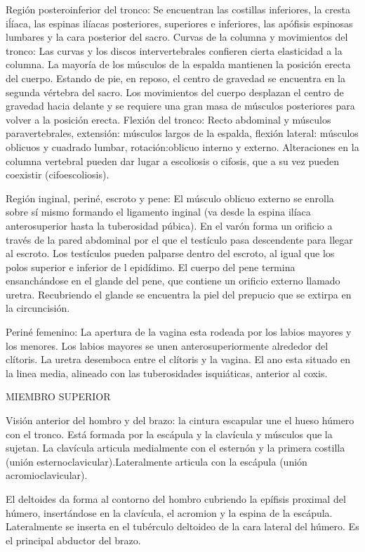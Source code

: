 Región posteroinferior del tronco: Se encuentran las costillas inferiores, la cresta iĺíaca, las espinas ilíacas posteriores, superiores e inferiores, las apófisis espinosas lumbares y la cara posterior del sacro.
Curvas de la columna y movimientos del tronco: Las curvas y los discos intervertebrales confieren cierta elasticidad a la columna. La mayoría de los músculos de la espalda mantienen la posición erecta del cuerpo. Estando de pie, en reposo, el centro de gravedad se encuentra en la segunda vértebra del sacro. Los movimientos del cuerpo desplazan el centro de gravedad hacia delante y se requiere una gran masa de músculos posteriores para volver a la posición erecta. Flexión del tronco: Recto abdominal y músculos paravertebrales, extensión: músculos largos de la espalda, flexión lateral: músculos oblicuos y cuadrado lumbar, rotación:oblicuo interno y externo. Alteraciones en la columna vertebral pueden dar lugar a escoliosis o cifosis, que a su vez pueden coexistir (cifoescoliosis).

Región inginal, periné, escroto y pene: El músculo oblicuo externo se enrolla sobre sí mismo formando el ligamento inginal (va desde la espina ilíaca anterosuperior hasta la tuberosidad púbica). En el varón forma un orificio a través de la pared abdominal por el que el testículo pasa descendente para llegar al escroto. Los testículos pueden palparse dentro del escroto, al igual que los polos superior e inferior de l epidídimo. El cuerpo del pene termina ensanchándose en el glande del pene, que contiene un orificio externo llamado uretra. Recubriendo el glande se encuentra la piel del prepucio que se extirpa en la circuncisión.

Periné femenino: La apertura de la vagina esta rodeada por los labios mayores y los menores. Los labios mayores se unen anterosuperiormente alrededor del clítoris. La uretra desemboca entre el clítoris y la vagina. El ano esta situado en la linea media, alineado con las tuberosidades isquiáticas, anterior al coxis.


MIEMBRO SUPERIOR

Visión anterior del hombro y del brazo: la cintura escapular une el hueso húmero con el tronco. Está formada por la escápula y la clavícula y músculos que la sujetan. La clavícula articula medialmente con el esternón y la primera costilla (unión esternoclavicular).Lateralmente articula con la escápula (unión acromioclavicular).

El deltoides da forma al contorno del hombro cubriendo la epífisis proximal del húmero, insertándose en la clavícula, el acromion y la espina de la escápula. Lateralmente se inserta en el tubérculo deltoideo de la cara lateral del húmero. Es el principal abductor del brazo.

